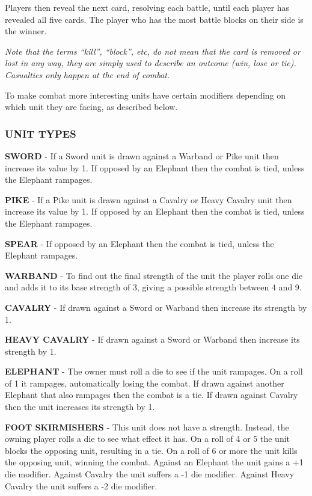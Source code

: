 Players then reveal the next card, resolving each battle, until each player has revealed all five cards. The player who has the most battle blocks on their side is the winner.

\textit{Note that the terms “kill”, “block”, etc, do not mean that the card is removed or lost in any way, they are simply used to describe an outcome (win, lose or tie). Casualties only happen at the end of combat.}

To make combat more interesting units have certain modifiers depending on which unit they are facing, as described below.

\subsubsection{UNIT TYPES}

\textbf{SWORD} - If a Sword unit is drawn against a Warband or Pike unit then increase its value by 1. If opposed by an Elephant then the combat is tied, unless the Elephant rampages.

\textbf{PIKE} - If a Pike unit is drawn against a Cavalry or Heavy Cavalry unit then increase its value by 1. If opposed by an Elephant then the combat is tied, unless the Elephant rampages.

\textbf{SPEAR} - If opposed by an Elephant then the combat is tied, unless the Elephant rampages.

\textbf{WARBAND} - To find out the final strength of the unit the player rolls one die and adds it to its base strength of 3, giving a possible strength between 4 and 9.

\textbf{CAVALRY} - If drawn against a Sword or Warband then increase its strength by 1.

\textbf{HEAVY CAVALRY} - If drawn against a Sword or Warband then increase its strength by 1.

\textbf{ELEPHANT} - The owner must roll a die to see if the unit rampages. On a roll of 1 it rampages, automatically losing the combat. If drawn against another Elephant that also rampages then the combat is a tie. If drawn against Cavalry then the unit increases its strength by 1.

\textbf{FOOT SKIRMISHERS} - This unit does not have a strength. Instead, the owning player rolls a die to see what effect it has. On a roll of 4 or 5 the unit blocks the opposing unit, resulting in a tie. On a roll of 6 or more the unit kills the opposing unit, winning the combat. Against an Elephant the unit gains a +1 die modifier. Against Cavalry the unit suffers a -1 die modifier. Against Heavy Cavalry the unit suffers a -2 die modifier.

